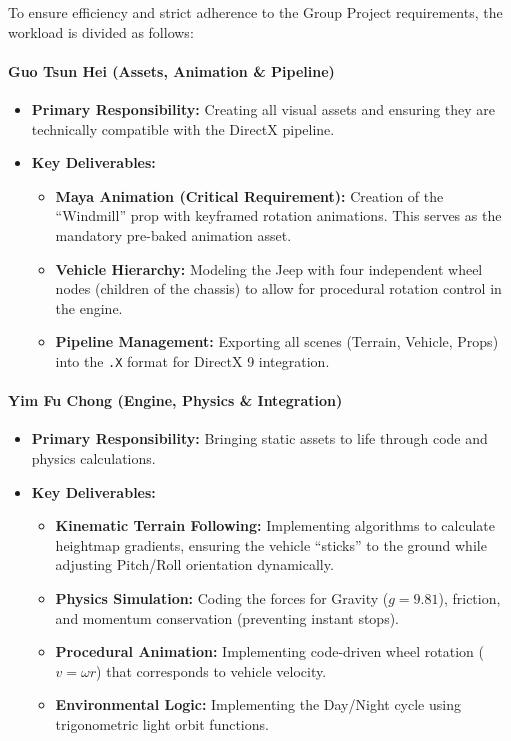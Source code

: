 \documentclass[11pt,a4paper]{article}
\begin{document}
To ensure efficiency and strict adherence to the Group Project requirements, the workload is divided as follows:

\paragraph{Guo Tsun Hei (Assets, Animation \& Pipeline)}
\begin{itemize}
  \item \textbf{Primary Responsibility:} Creating all visual assets and ensuring they are technically compatible with the DirectX pipeline.
  \item \textbf{Key Deliverables:}
    \begin{itemize}
      \item \textbf{Maya Animation (Critical Requirement):} Creation of the ``Windmill'' prop with keyframed rotation animations. This serves as the mandatory pre-baked animation asset.
      \item \textbf{Vehicle Hierarchy:} Modeling the Jeep with four independent wheel nodes (children of the chassis) to allow for procedural rotation control in the engine.
      \item \textbf{Pipeline Management:} Exporting all scenes (Terrain, Vehicle, Props) into the \texttt{.X} format for DirectX 9 integration.
    \end{itemize}
\end{itemize}

\paragraph{Yim Fu Chong (Engine, Physics \& Integration)}
\begin{itemize}
  \item \textbf{Primary Responsibility:} Bringing static assets to life through code and physics calculations.
  \item \textbf{Key Deliverables:}
    \begin{itemize}
      \item \textbf{Kinematic Terrain Following:} Implementing algorithms to calculate heightmap gradients, ensuring the vehicle ``sticks'' to the ground while adjusting Pitch/Roll orientation dynamically.
      \item \textbf{Physics Simulation:} Coding the forces for Gravity ($g = 9.81$), friction, and momentum conservation (preventing instant stops).
      \item \textbf{Procedural Animation:} Implementing code-driven wheel rotation ($v = \omega r$) that corresponds to vehicle velocity.
      \item \textbf{Environmental Logic:} Implementing the Day/Night cycle using trigonometric light orbit functions.
    \end{itemize}
\end{itemize}
\end{document}
